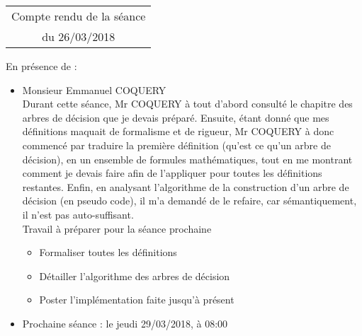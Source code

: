 \documentclass[a4paper, 11pt]{report}
\begin{document}
 
\begin{center}
\begin{tabular}{|c|}
\hline
Compte rendu de la séance \\du 26\//03\//2018\\
\hline

\end{tabular}
\end{center}


En présence de :\\
\begin{itemize}
\item Monsieur Emmanuel COQUERY\\
Durant cette séance, Mr COQUERY à tout d'abord consulté le chapitre des arbres de décision que je devais préparé. Ensuite, étant donné que mes définitions maquait de formalisme et de rigueur, Mr COQUERY
à donc commencé par traduire la première définition (qu'est ce qu'un arbre de décision), en un ensemble de formules mathématiques, tout en me montrant comment je devais faire afin de l'appliquer pour toutes les définitions restantes. Enfin, en analysant l'algorithme de la construction d'un arbre de décision (en pseudo code), il m'a demandé de le refaire, car sémantiquement, il n'est pas auto-suffisant.\\
Travail à préparer pour la séance prochaine
\begin{itemize}
\item Formaliser toutes les définitions
\item Détailler l'algorithme des arbres de décision
\item Poster l'implémentation faite jusqu'à présent
\end{itemize}
\item Prochaine séance :  le jeudi 29/03/2018, à 08:00

\end{itemize}
\end{document}
